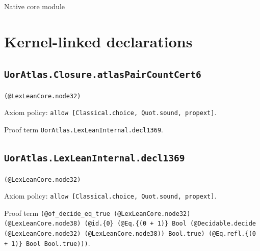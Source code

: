 \documentclass[11pt]{article}
\begin{document}
\begin{center}{\LARGE Native core module}\end{center}
\section*{Kernel-linked declarations}
\subsection*{\texttt{UorAtlas.Closure.atlasPairCountCert6}}
\noindent\texttt{(@LexLeanCore.node32)}\par
\noindent Axiom policy: \texttt{allow [Classical.choice, Quot.sound, propext]}.\par
\noindent Proof term \texttt{UorAtlas.LexLeanInternal.decl1369}.\par
\subsection*{\texttt{UorAtlas.LexLeanInternal.decl1369}}
\noindent\texttt{(@LexLeanCore.node32)}\par
\noindent Axiom policy: \texttt{allow [Classical.choice, Quot.sound, propext]}.\par
\noindent Proof term \texttt{(@of\_decide\_eq\_true (@LexLeanCore.node32) (@LexLeanCore.node38) (@id.\{0\} (@Eq.\{(0 + 1)\} Bool (@Decidable.decide (@LexLeanCore.node32) (@LexLeanCore.node38)) Bool.true) (@Eq.refl.\{(0 + 1)\} Bool Bool.true)))}.\par
\end{document}
